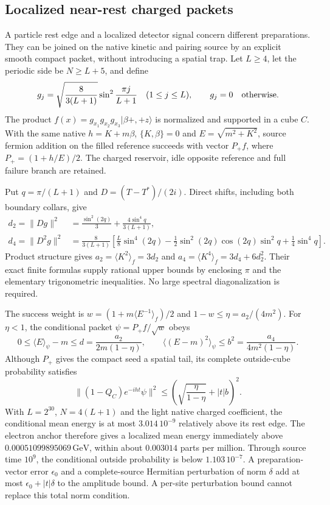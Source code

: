 \subsection{Localized near-rest charged packets}

A particle rest edge and a localized detector signal concern different
preparations. They can be joined on the native kinetic and pairing source
by an explicit smooth compact packet, without introducing a spatial trap.
Let $L\ge4$, let the periodic side be $N\ge L+5$, and define
\[
 g_j=\sqrt{\frac{8}{3(L+1)}}\sin^2\frac{\pi j}{L+1}
 \quad(1\le j\le L),\qquad g_j=0\quad\hbox{otherwise}.
\]
The product $f(x)=g_{x_1}g_{x_2}g_{x_3}|\beta+,+z\rangle$
is normalized and supported in a cube $C$. With the same native
$h=K+m\beta$, $\{K,\beta\}=0$ and $E=\sqrt{m^2+K^2}$, source
fermion addition on the filled reference succeeds with vector $P_+f$,
where $P_+=(1+h/E)/2$. The charged reservoir, idle opposite reference
and full failure branch are retained.

Put $q=\pi/(L+1)$ and $D=(T-T^*)/(2i)$. Direct shifts, including both
boundary collars, give
\begin{align*}
 d_2=\|Dg\|^2&=\frac{\sin^2(2q)}3+
                    \frac{4\sin^4q}{3(L+1)},\\
 d_4=\|D^2g\|^2&=\frac8{3(L+1)}
 \left[\frac L8\sin^4(2q)-\frac12\sin^2(2q)\cos(2q)\sin^2q
                                  +\frac14\sin^4q\right].
\end{align*}
Product structure gives $a_2=\langle K^2\rangle_f=3d_2$ and
$a_4=\langle K^4\rangle_f=3d_4+6d_2^2$. Their exact finite formulas
supply rational upper bounds by enclosing $\pi$ and the elementary
trigonometric inequalities. No large spectral diagonalization is required.

The success weight is $w=(1+m\langle E^{-1}\rangle_f)/2$ and
$1-w\le\eta=a_2/(4m^2)$. For $\eta<1$, the conditional packet
$\psi=P_+f/\sqrt w$ obeys
\[
 0\le\langle E\rangle_\psi-m\le d=
   \frac{a_2}{2m(1-\eta)},\qquad
 \langle(E-m)^2\rangle_\psi\le b^2=
   \frac{a_4}{4m^2(1-\eta)}.
\]
Although $P_+$ gives the compact seed a spatial tail, its complete
outside-cube probability satisfies
\[
 \|(1-Q_C)e^{-iht}\psi\|^2\le
 \left(\sqrt{\frac\eta{1-\eta}}+|t|b\right)^2.
\]
With $L=2^{30}$, $N=4(L+1)$ and the light native charged coefficient,
the conditional mean energy is at most $3.014\,10^{-9}$ relatively above
its rest edge. The electron anchor therefore gives a localized mean energy
immediately above $0.00051099895069\,\mathrm{GeV}$, within about
$0.003014$ parts per million. Through source time $10^9$, the conditional
outside probability is below $1.103\,10^{-7}$. A preparation-vector error
$\epsilon_0$ and a complete-source Hermitian perturbation of norm $\delta$
add at most $\epsilon_0+|t|\delta$ to the amplitude bound. A per-site
perturbation bound cannot replace this total norm condition.

